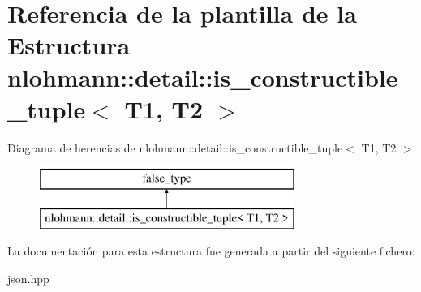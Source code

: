 \hypertarget{structnlohmann_1_1detail_1_1is__constructible__tuple}{}\section{Referencia de la plantilla de la Estructura nlohmann\+:\+:detail\+:\+:is\+\_\+constructible\+\_\+tuple$<$ T1, T2 $>$}
\label{structnlohmann_1_1detail_1_1is__constructible__tuple}
Diagrama de herencias de nlohmann\+:\+:detail\+:\+:is\+\_\+constructible\+\_\+tuple$<$ T1, T2 $>$\begin{figure}[H]
\begin{center}
\leavevmode
\includegraphics[height=2.000000cm]{structnlohmann_1_1detail_1_1is__constructible__tuple}
\end{center}
\end{figure}


La documentación para esta estructura fue generada a partir del siguiente fichero\+:\begin{DoxyCompactItemize}
\item 
json.\+hpp\end{DoxyCompactItemize}
